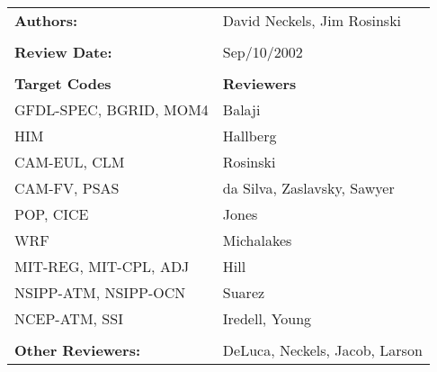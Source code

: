 
\begin{tabular}{l l}

{\bf Authors:} & David Neckels, Jim Rosinski \\ \\

{\bf Review Date:}          & Sep/10/2002 \\ \\

{\bf Target Codes}            & {\bf Reviewers} \\
GFDL-SPEC, BGRID, MOM4        & Balaji \\ 
HIM                           & Hallberg \\
CAM-EUL, CLM                  & Rosinski \\
CAM-FV, PSAS                  & da Silva, Zaslavsky, Sawyer\\
POP, CICE                     & Jones \\
WRF                           & Michalakes \\
MIT-REG, MIT-CPL, ADJ         & Hill \\
NSIPP-ATM, NSIPP-OCN          & Suarez \\
NCEP-ATM, SSI                 & Iredell, Young \\ \\

{\bf Other Reviewers:}        & DeLuca, Neckels, Jacob, Larson

\end{tabular}


